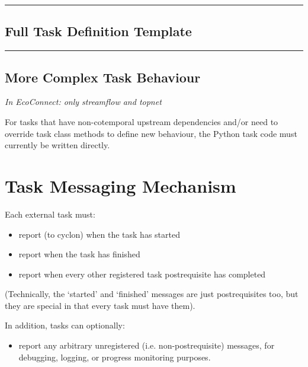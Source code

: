 \documentclass[11pt,a4paper]{article}
\begin{document}
\lstset{language=sh, numbers=left}

{\tiny
\noindent
\rule{5cm}{.2mm}

}

\subsection{Full Task Definition Template}

\lstset{language=sh, numbers=left}

{\tiny
\noindent
\rule{5cm}{.2mm}

}

\subsection{More Complex Task Behaviour}

\textit{In EcoConnect: only streamflow and topnet}

For tasks that have non-cotemporal upstream dependencies and/or need to  
override task class methods to define new behaviour, the Python task
code must currently be written directly. 

\section{Task Messaging Mechanism}

Each external task must:

\begin{itemize}
\item report (to cyclon) when the task has started
\item report when the task has finished
\item report when every other registered task postrequisite has
completed
\end{itemize}

(Technically, the `started' and `finished' messages are just
postrequisites too, but they are special in that every task
must have them).

In addition, tasks can optionally:

\begin{itemize}
\item report any arbitrary unregistered (i.e. non-postrequisite)
messages, for debugging, logging, or progress monitoring purposes.
\end{itemize}
\end{document}
